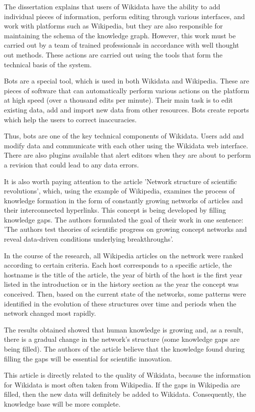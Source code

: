 The dissertation explains that users of Wikidata have the ability to add individual pieces of information, perform editing through various interfaces, and work with platforms such as Wikipedia, but they are also responsible for maintaining the schema of the knowledge graph. However, this work must be carried out by a team of trained professionals in accordance with well thought out methods. These actions are carried out using the tools that form the technical basis of the system.

Bots are a special tool, which is used in both Wikidata and Wikipedia. These are pieces of software that can automatically perform various actions on the platform at high speed (over a thousand edits per minute). Their main task is to edit existing data, add and import new data from other resources. Bots create reports which help the users to correct inaccuracies.

Thus, bots are one of the key technical components of Wikidata. Users add and modify data and communicate with each other using the Wikidata web interface. There are also plugins available that alert editors when they are about to perform a revision that could lead to any data errors.

It is also worth paying attention to the article 'Network structure of scientific revolutions', which, using the example of Wikipedia, examines the process of knowledge formation in the form of constantly growing networks of articles and their interconnected hyperlinks. This concept is being developed by filling knowledge gaps. The authors formulated the goal of their work in one sentence: 'The authors test theories of scientific progress on growing concept networks and reveal data-driven conditions underlying breakthroughs'.

In the course of the research, all Wikipedia articles on the network were ranked according to certain criteria. Each host corresponds to a specific article, the hostname is the title of the article, the year of birth of the host is the first year listed in the introduction or in the history section as the year the concept was conceived. Then, based on the current state of the networks, some patterns were identified in the evolution of these structures over time and periods when the network changed most rapidly.

The results obtained showed that human knowledge is growing and, as a result, there is a gradual change in the network's structure (some knowledge gaps are being filled). The authors of the article believe that the knowledge found during filling the gaps will be essential for scientific innovation.

This article is directly related to the quality of Wikidata, because the information for Wikidata is most often taken from Wikipedia. If the gaps in Wikipedia are filled, then the new data will definitely be added to Wikidata. Consequently, the knowledge base will be more complete.